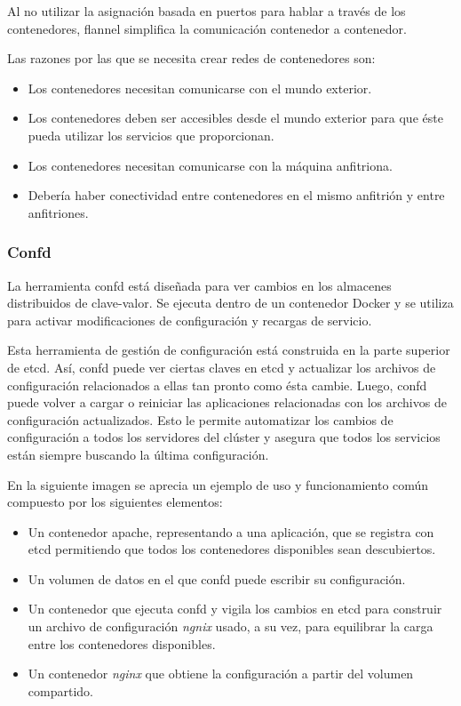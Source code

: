 Al no utilizar la asignación basada en puertos para hablar a través de los contenedores, flannel simplifica la comunicación contenedor a contenedor.

Las razones por las que se necesita crear redes de contenedores son:
\begin{itemize}
\item Los contenedores necesitan comunicarse con el mundo exterior.
\item Los contenedores deben ser accesibles desde el mundo exterior para que éste pueda utilizar los servicios que proporcionan.
\item Los contenedores necesitan comunicarse con la máquina anfitriona.
\item Debería haber conectividad entre contenedores en el mismo anfitrión y entre anfitriones.
\end{itemize}

\subsubsection{Confd}

La herramienta confd está diseñada para ver cambios en los almacenes distribuidos de clave-valor. Se ejecuta dentro de un contenedor Docker y se utiliza para activar modificaciones de configuración y recargas de servicio.

Esta herramienta de gestión de configuración está construida en la parte superior de etcd. Así, confd puede ver ciertas claves en etcd y actualizar los archivos de configuración relacionados a ellas tan pronto como ésta cambie. Luego, confd puede volver a cargar o reiniciar las aplicaciones relacionadas con los archivos de configuración actualizados. Esto le permite automatizar los cambios de configuración a todos los servidores del clúster y asegura que todos los servicios están siempre buscando la última configuración.

En la siguiente imagen se aprecia un ejemplo de uso y funcionamiento común compuesto por los siguientes elementos: 
\begin{itemize}
\item Un contenedor apache, representando a una aplicación, que se registra con etcd permitiendo que todos los contenedores disponibles sean descubiertos. 
\item Un volumen de datos en el que confd puede escribir su configuración.
\item Un contenedor que ejecuta confd y vigila los cambios en etcd para construir un archivo de configuración \textit{ngnix} usado, a su vez, para equilibrar la carga entre los contenedores disponibles.
\item Un contenedor \textit{nginx} que obtiene la configuración a partir del volumen compartido.
\end{itemize}

